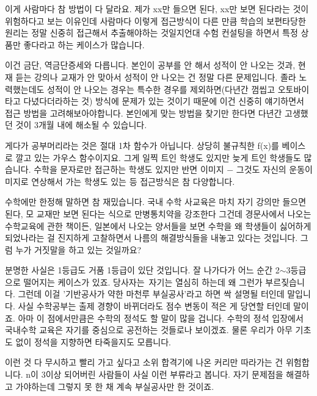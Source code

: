 이게 사람마다 참 방법이 다 달라요.
제가 xx만 들으면 된다, xx만 보면 된다라는 것이 위험하다고 보는 이유인데
사람마다 이렇게 접근방식이 다른 만큼 학습의 보편타당한 원리는 정말 신중히 접근해서 추출해야하는 것일지언대
수험 컨설팅을 하면서 특정 상품만 좋다라고 하는 케이스가 많습니다.
\vspace{5mm}

이건 금단, 역금단증세와 다릅니다.
본인이 공부를 안 해서 성적이 안 나오는 것과, 현재 듣는 강의나 교재가 안 맞아서 성적이 안 나오는 건 정말 다른 문제입니다.
졸라 노력했는데도 성적이 안 나오는 경우는 특수한 경우를 제외하면(다년간 껌씹고 오토바이타고 다녔다더라하는 것)
방식에 문제가 있는 것이기 때문에 이건 신중히 얘기하면서 접근 방법을 고려해보아야합니다.
본인에게 맞는 방법을 찾기만 한다면 다년간 고생했던 것이 3개월 내에 해소될 수 있습니다.
\vspace{5mm}

게다가 공부머리라는 것은 절대 1차 함수가 아닙니다. 상당히 불규칙한 f(x)를 베이스로 깔고 있는 가우스 함수이지요.
그게 일찍 트인 학생도 있지만 늦게 트인 학생들도 많습니다.
수학을 문자로만 접근하는 학생도 있지만 반면 이미지 $-$
그것도 자신의 운동이미지로 연상해서 가는 학생도 있는 등 접근방식은 참 다양합니다.
\vspace{5mm}

수학에만 한정해 말하면 참 재밌습니다.
국내 수학 사교육은 마치 자기 강의만 들으면 된다, 모 교재만 보면 된다는 식으로 만병통치약을 강조한다 그건데
경문사에서 나오는 수학교육에 관한 책이든, 일본에서 나오는 양서들을 보면
수학을 왜 학생들이 싫어하게 되었나라는 걸 진지하게 고찰하면서 나름의 해결방식들을 내놓고 있다는 것입니다.
그럼 누가 거짓말을 하고 있는 것일까요?
\vspace{5mm}

분명한 사실은 1등급도 거품 1등급이 있단 것입니다. 잘 나가다가 어느 순간 2$\sim$3등급으로 떨어지는 케이스가 있죠.
당사자는 자기는 열심히 하는데 왜 그런가 부르짖습니다. 그런데 이걸 '기반공사가 약한 마천루 부실공사'라고 하면 싹 설명될 터인데 말입니다.
사실 수학공부는 출제 경향이 바뀌더라도 점수 변동이 적은 게 당연할 터인데 말이죠.
아마 이 점에서만큼은 수학의 정석도 할 말이 많을 겁니다. 수학의 정석 입장에서 국내수학 교육은 자기를 중심으로 공전하는 것들로나 보이겠죠.
물론 우리가 아무 기초도 없이 정석을 지향하면 타죽을지도 모릅니다.
\vspace{5mm}

이런 것 다 무시하고 빨리 가고 싶다고 소위 합격기에 나온 커리만 따라가는 건 위험합니다.
n이 3이상 되어버린 사람들이 사실 이런 부류라고 봅니다. 자기 문제점을 해결하고 가야하는데 그렇지 못 한 채 계속 부실공사만 한 것이죠.
\vspace{5mm}






